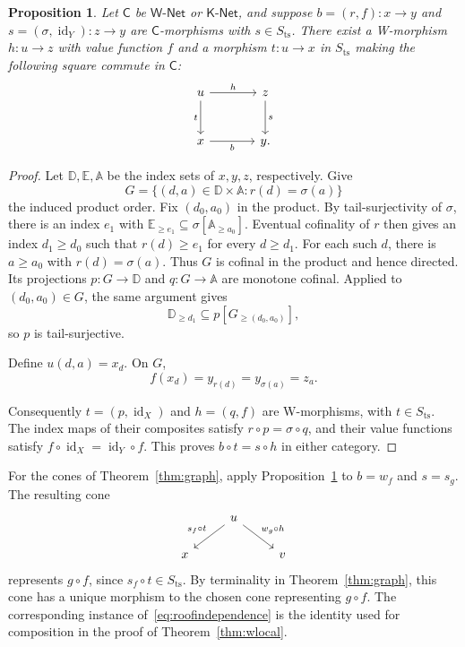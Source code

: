 \documentclass[11pt,a4paper]{article}
\newtheorem{proposition}[theorem]{Proposition}
\theoremstyle{definition}
\theoremstyle{remark}
\newcommand{\Wpar}{\mathsf{W\text{-}Net}}
\newcommand{\Kpar}{\mathsf{K\text{-}Net}}
\newcommand{\CC}{\mathsf C}
\newcommand{\id}{\operatorname{id}}
\newcommand{\Sts}{S_{\mathrm{ts}}}
\begin{document}
\begin{proposition}\label{prop:ore}
Let \(\CC\) be \(\Wpar\) or \(\Kpar\), and suppose
\(b=(r,f):x\to y\) and \(s=(\sigma,\id_Y):z\to y\) are
\(\CC\)-morphisms with \(s\in\Sts\). There exist a W-morphism
\(h:u\to z\) with value function \(f\) and a morphism
\(t:u\to x\) in \(\Sts\) making the following square commute
in \(\CC\):
\[
\begin{tikzcd}[column sep=large,row sep=large]
u \arrow[r,"h"] \arrow[d,"t"'] & z \arrow[d,"s"] \\
x \arrow[r,"b"'] & y.
\end{tikzcd}
\]
\end{proposition}
\begin{proof}
Let \(\mathbb D,\mathbb E,\mathbb A\) be the index sets of
\(x,y,z\), respectively. Give
\[
 G=\{(d,a)\in\mathbb D\times\mathbb A:r(d)=\sigma(a)\}
\]
the induced product order. Fix \((d_0,a_0)\) in the product.
By tail-surjectivity of \(\sigma\), there is an index \(e_1\) with
\(\mathbb E_{\ge e_1}\subseteq\sigma[\mathbb A_{\ge a_0}]\).
Eventual cofinality of \(r\) then gives an index \(d_1\ge d_0\)
such that \(r(d)\ge e_1\) for every \(d\ge d_1\).
For each such \(d\), there is \(a\ge a_0\) with
\(r(d)=\sigma(a)\). Thus \(G\)
is cofinal in the product and hence directed. Its projections
\(p:G\to\mathbb D\) and \(q:G\to\mathbb A\) are monotone
cofinal. Applied to \((d_0,a_0)\in G\), the same argument gives
\[
 \mathbb D_{\ge d_1}\subseteq p[G_{\ge(d_0,a_0)}],
\]
so \(p\) is tail-surjective.

Define \(u(d,a)=x_d\). On \(G\),
\[
 f(x_d)=y_{r(d)}=y_{\sigma(a)}=z_a.
\]

Consequently \(t=(p,\id_X)\) and \(h=(q,f)\) are W-morphisms,
with \(t\in\Sts\). The index maps of their composites satisfy
\(r\circ p=\sigma\circ q\), and their value functions satisfy
\(f\circ\id_X=\id_Y\circ f\). This proves
\(b\circ t=s\circ h\) in either category.
\end{proof}

For the cones of Theorem~\ref{thm:graph}, apply
Proposition~\ref{prop:ore} to \(b=w_f\) and \(s=s_g\).
The resulting cone
\[
\begin{tikzcd}[column sep=2.5em,row sep=1.8em]
& u \arrow[dl,"s_f\circ t"'] \arrow[dr,"w_g\circ h"] & \\
x & & v
\end{tikzcd}
\]
represents \(g\circ f\), since \(s_f\circ t\in\Sts\).
By terminality in Theorem~\ref{thm:graph}, this cone has a unique
morphism to the chosen cone representing \(g\circ f\). The
corresponding instance of~\eqref{eq:roofindependence} is the identity
used for composition in the proof of Theorem~\ref{thm:wlocal}.
\end{document}
